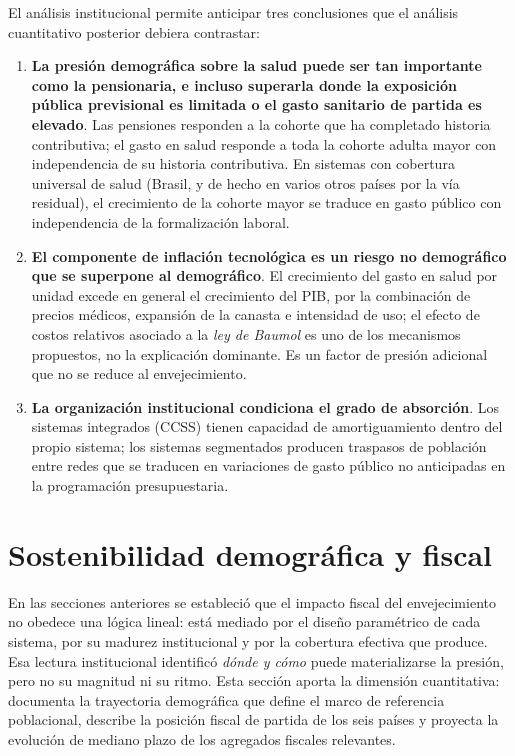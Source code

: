 \documentclass[12pt, letterpaper]{article}
\begin{document}
El análisis institucional permite anticipar tres conclusiones que el análisis
cuantitativo posterior debiera contrastar:

\begin{enumerate}
  \item \textbf{La presión demográfica sobre la salud puede ser tan importante
        como la pensionaria, e incluso superarla donde la exposición pública
        previsional es limitada o el gasto sanitario de partida es elevado}. Las pensiones
        responden a la cohorte que ha completado historia contributiva; el gasto
        en salud responde a toda la cohorte adulta mayor con independencia de su
        historia contributiva. En sistemas con cobertura universal de salud
        (Brasil, y de hecho en varios otros países por la vía residual), el
        crecimiento de la cohorte mayor se traduce en gasto público con
        independencia de la formalización laboral.
  \item \textbf{El componente de inflación tecnológica es un riesgo no
        demográfico que se superpone al demográfico}. El crecimiento del gasto
        en salud por unidad excede en general el crecimiento del PIB, por la
        combinación de precios médicos, expansión de la canasta e intensidad de
        uso; el efecto de costos relativos asociado a la \textit{ley de Baumol}
        es uno de los mecanismos propuestos, no la explicación dominante. Es un
        factor de presión adicional que no se reduce al envejecimiento.
  \item \textbf{La organización institucional condiciona el grado de
        absorción}. Los sistemas integrados (CCSS) tienen capacidad de
        amortiguamiento dentro del propio sistema; los sistemas segmentados producen
        traspasos de población entre redes que se traducen en variaciones
        de gasto público no anticipadas en la programación presupuestaria.
\end{enumerate}

\newpage

\section{Sostenibilidad demográfica y fiscal}
\label{sec:sostenibilidad}

En las secciones anteriores se estableció que el impacto fiscal del envejecimiento no obedece una lógica lineal:
está mediado por el diseño paramétrico de cada sistema, por su madurez institucional
y por la cobertura efectiva que produce. Esa lectura institucional identificó
\emph{dónde y cómo} puede materializarse la presión, pero no su magnitud ni su ritmo. Esta
sección aporta la dimensión cuantitativa: documenta la trayectoria demográfica que
define el marco de referencia poblacional, describe la posición fiscal de partida de los seis
países y proyecta la evolución de mediano plazo de los agregados fiscales relevantes.
\end{document}
